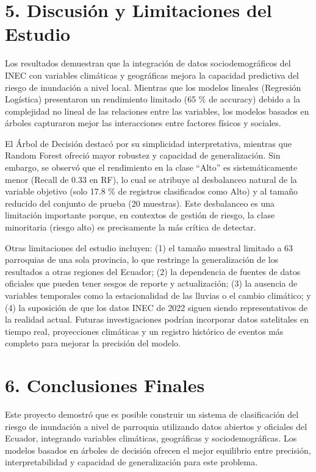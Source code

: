 \documentclass[12pt,a4paper]{article}
\begin{document}
\section{5. Discusión y Limitaciones del Estudio}

Los resultados demuestran que la integración de datos sociodemográficos del INEC con variables climáticas y geográficas mejora la capacidad predictiva del riesgo de inundación a nivel local. Mientras que los modelos lineales (Regresión Logística) presentaron un rendimiento limitado (65 \% de accuracy) debido a la complejidad no lineal de las relaciones entre las variables, los modelos basados en árboles capturaron mejor las interacciones entre factores físicos y sociales.

El Árbol de Decisión destacó por su simplicidad interpretativa, mientras que Random Forest ofreció mayor robustez y capacidad de generalización. Sin embargo, se observó que el rendimiento en la clase ``Alto'' es sistemáticamente menor (Recall de 0.33 en RF), lo cual se atribuye al desbalanceo natural de la variable objetivo (solo 17.8 \% de registros clasificados como Alto) y al tamaño reducido del conjunto de prueba (20 muestras). Este desbalanceo es una limitación importante porque, en contextos de gestión de riesgo, la clase minoritaria (riesgo alto) es precisamente la más crítica de detectar.

Otras limitaciones del estudio incluyen: (1) el tamaño muestral limitado a 63 parroquias de una sola provincia, lo que restringe la generalización de los resultados a otras regiones del Ecuador; (2) la dependencia de fuentes de datos oficiales que pueden tener sesgos de reporte y actualización; (3) la ausencia de variables temporales como la estacionalidad de las lluvias o el cambio climático; y (4) la suposición de que los datos INEC de 2022 siguen siendo representativos de la realidad actual. Futuras investigaciones podrían incorporar datos satelitales en tiempo real, proyecciones climáticas y un registro histórico de eventos más completo para mejorar la precisión del modelo.

\section{6. Conclusiones Finales}

Este proyecto demostró que es posible construir un sistema de clasificación del riesgo de inundación a nivel de parroquia utilizando datos abiertos y oficiales del Ecuador, integrando variables climáticas, geográficas y sociodemográficas. Los modelos basados en árboles de decisión ofrecen el mejor equilibrio entre precisión, interpretabilidad y capacidad de generalización para este problema.
\end{document}
